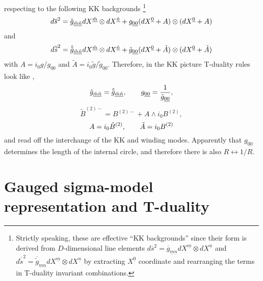 \documentclass[a4paper,11pt]{article}
\begin{document}
respecting to the following KK backgrounds
\footnote{Strictly speaking, these are effective ``KK backgrounds'' since their
form is derived from $D$-dimensional line elements 
$d{\overline s}^2={\overline g}_{\underline{m}\underline{n}}dX^{\underline m}
\otimes dX^{\underline n}$ and
$d{\overline{\tilde s}}^2={\overline {\tilde g}}_{\underline{m}\underline{n}}
dX^{\underline m}\otimes dX^{\underline n}$ by extracting $X^{\underline 0}$
coordinate and rearranging the terms in T-duality invariant combinations.}
\begin{equation}\plabel{intdir}
d\overline{s}^2=\hat{g}_{\underline{\tilde m}\underline{\tilde n}}
dX^{\underline{\tilde m}}\otimes dX^{\underline{\tilde n}}+g_{\underline{00}}
(dX^{\underline{0}}+A)\otimes (dX^{\underline{0}}+A)
\end{equation}
and
\begin{equation}\plabel{intdua}
d\overline{\tilde s}^2=
\hat{\tilde g}_{\underline{\tilde m}\underline{\tilde n}}
dX^{\underline{\tilde m}}\otimes dX^{\underline{\tilde n}}
+\tilde{g}_{\underline{00}}
(dX^{\underline{0}}+\tilde{A})\otimes (dX^{\underline{0}}+\tilde{A})
\end{equation}
with $A=i_0 g/g_{\underline{00}}$ and $\tilde{A}=i_0 \tilde{g}/
\tilde{g}_{\underline{00}}$. Therefore, in the KK picture T-duality rules
look like \cite{bko}, \cite{clps}
$$
\hat{g}_{\underline{\tilde m}\underline{\tilde n}}=
\hat{\tilde g}_{\underline{\tilde m}\underline{\tilde n}},\qquad
g_{\underline{00}}={1\over {\tilde g}_{\underline{00}}},
$$
$$
{\tilde B}^{(2)-}=B^{(2)-}+A\wedge i_0 B^{(2)},
$$
\begin{equation}\plabel{TRBKK}
A=i_0 \tilde{B}^{(2)},\qquad \tilde{A}=i_0 B^{(2)}
\end{equation}
and read off the interchange of the KK and winding modes. Apparently that
$g_{\underline{00}}$ determines the length of the internal circle, and
therefore there is also $R \leftrightarrow 1/R$.


\section{Gauged sigma-model representation and T-duality}
\end{document}
